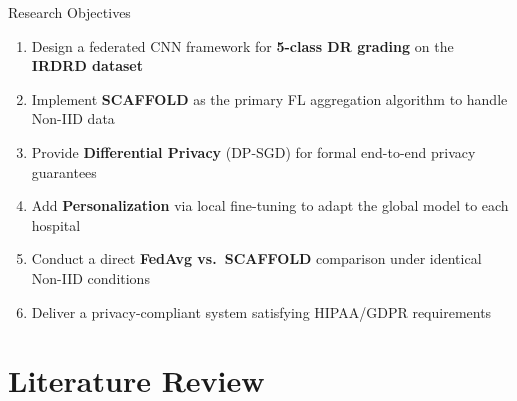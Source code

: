 \documentclass[aspectratio=169, 11pt]{beamer}
\begin{document}
\begin{frame}{Research Objectives}
  \begin{enumerate}\small
    \item[\textbf{O1.}] Design a federated CNN framework for \textbf{5-class DR grading} on the \textbf{IRDRD dataset}
    \item[\textbf{O2.}] Implement \textbf{SCAFFOLD} as the primary FL aggregation algorithm to handle Non-IID data
    \item[\textbf{O3.}] Provide \textbf{Differential Privacy} (DP-SGD) for formal end-to-end privacy guarantees
    \item[\textbf{O4.}] Add \textbf{Personalization} via local fine-tuning to adapt the global model to each hospital
    \item[\textbf{O5.}] Conduct a direct \textbf{FedAvg vs.\ SCAFFOLD} comparison under identical Non-IID conditions
    \item[\textbf{O6.}] Deliver a privacy-compliant system satisfying HIPAA/GDPR requirements
  \end{enumerate}
\end{frame}

\section{Literature Review}
\end{document}
